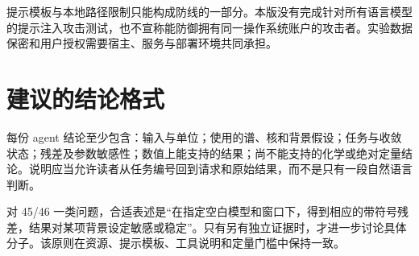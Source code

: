 提示模板与本地路径限制只能构成防线的一部分。本版没有完成针对所有语言模型的提示注入攻击测试，也不宣称能防御拥有同一操作系统账户的攻击者。实验数据保密和用户授权需要宿主、服务与部署环境共同承担。

\section{建议的结论格式}
每份 agent 结论至少包含：输入与单位；使用的谱、核和背景假设；任务与收敛状态；残差及参数敏感性；数值上能支持的结果；尚不能支持的化学或绝对定量结论。说明应当允许读者从任务编号回到请求和原始结果，而不是只有一段自然语言判断。

对 45/46 一类问题，合适表述是“在指定空白模型和窗口下，得到相应的带符号残差，结果对某项背景设定敏感或稳定”。只有另有独立证据时，才进一步讨论具体分子。该原则在资源、提示模板、工具说明和定量门槛中保持一致。
